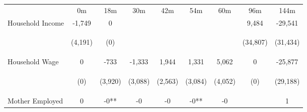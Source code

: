 \begin{tabular}{lcccccccc}
\hline \noalign{\smallskip} & 0m & 18m & 30m & 42m & 54m & 60m & 96m & 144m\\
\noalign{\smallskip}\hline \noalign{\smallskip}Household Income & -1,749 & 0 &  &  &  &  & 9,484 & -29,541\\
 & \begin{footnotesize}(4,191)\end{footnotesize} & \begin{footnotesize}(0)\end{footnotesize} & \begin{footnotesize}\end{footnotesize} & \begin{footnotesize}\end{footnotesize} & \begin{footnotesize}\end{footnotesize} & \begin{footnotesize}\end{footnotesize} & \begin{footnotesize}(34,807)\end{footnotesize} & \begin{footnotesize}(31,434)\end{footnotesize}\\
\noalign{\smallskip}Household Wage & 0 & -733 & -1,333 & 1,944 & 1,331 & 5,062 & 0 & -25,877\\
 & \begin{footnotesize}(0)\end{footnotesize} & \begin{footnotesize}(3,920)\end{footnotesize} & \begin{footnotesize}(3,088)\end{footnotesize} & \begin{footnotesize}(2,563)\end{footnotesize} & \begin{footnotesize}(3,084)\end{footnotesize} & \begin{footnotesize}(4,052)\end{footnotesize} & \begin{footnotesize}(0)\end{footnotesize} & \begin{footnotesize}(29,188)\end{footnotesize}\\
\noalign{\smallskip}Mother Employed & 0 & -0** & -0 & -0 & -0** & -0 &  & 1\\

\end{tabular}
